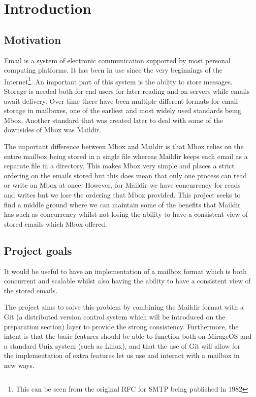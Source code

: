 \chapter{Introduction}

\section{Motivation}

Email is a system of electronic communication supported by most personal computing platforms. It has been in use since the very beginnings of the Internet\footnote{This can be seen from the original RFC for SMTP being published in 1982\cite{rfc821}}. An important part of this system is the ability to store messages. Storage is needed both for end users for later reading and on servers while emails await delivery. Over time there have been multiple different formats for email storage in mailboxes, one of the earliest and most widely used standards being Mbox. Another standard that was created later to deal with some of the downsides of Mbox was Maildir.

The important difference between Mbox and Maildir is that Mbox relies on the entire mailbox being stored in a single file whereas Maildir keeps each email as a separate file in a directory. This makes Mbox very simple and places a strict ordering on the emails stored but this does mean that only one process can read or write an Mbox at once. However, for Maildir we have concurrency for reads and writes but we lose the ordering that Mbox provided. This project seeks to find a middle ground where we can maintain some of the benefits that Maildir has such as concurrency whilst not losing the ability to have a consistent view of stored emails which Mbox offered.

\section{Project goals}

It would be useful to have an implementation of a mailbox format which is both concurrent and scalable whilst also having the ability to have a consistent view of the stored emails.

The project aims to solve this problem by combining the Maildir format with a Git (a distributed version control system which will be introduced on the preparation section) layer to provide the strong consistency. Furthermore, the intent is that the basic features should be able to function both on MirageOS and a standard Unix system (such as Linux), and that the use of Git will allow for the implementation of extra features let us use and interact with a mailbox in new ways.

